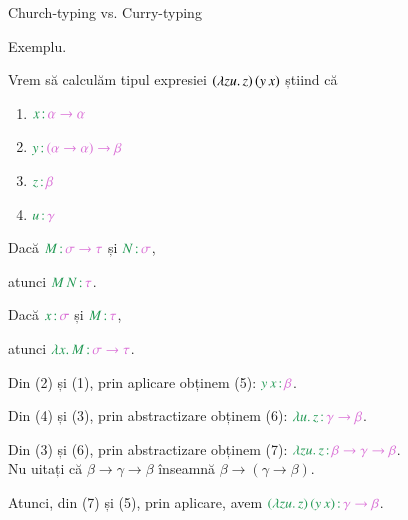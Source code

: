 \documentclass[xcolor=pdftex,romanian,colorlinks]{beamer}
\begin{document}
\begin{frame}{Church-typing vs. Curry-typing}

{\color{True} Exemplu.}

Vrem să calculăm tipul expresiei $(\lambda zu.\,z)\, (y\, x)$ știind că
\begin{minipage}{.45\columnwidth}
\begin{enumerate}
\item {\color{True}$\type{x}{\alpha \to \alpha}$}
\item {\color{True}$\type{y}{(\alpha \to \alpha) \to \beta}$}
\item ${\color{True}\type{z}{\beta}}$
\item ${\color{True}\type{u}{\gamma}}$
\end{enumerate}
\end{minipage} \hfill
\begin{minipage}{.54\columnwidth}
 \hfill Dacă $\type{M}{\sigma \to \tau}$ și $\type{N}{\sigma}$,

\hfill atunci $\type{\app{M}{N}}{\tau}$.

 \hfill Dacă $\type{x}{\sigma}$ și $\type{M}{\tau}$,

\hfill atunci $\type{\abs{x}{M}}{\sigma \to \tau}$.
\end{minipage}
\pause

Din (2) și (1), prin aplicare obținem (5): ${\color{True}\type{\app{y}{x}}{\beta}}$.

Din (4) și (3), prin abstractizare obținem (6): ${\color{True}\type{\abs{u}{z}}{\gamma \to \beta}}$.

Din (3) și (6), prin abstractizare obținem (7): ${\color{True}\type{\abs{zu}{z}}{\beta \to \gamma \to \beta}}$. \\
Nu uitați că $\beta \to \gamma \to \beta$ înseamnă $\beta \to (\gamma \to \beta)$.

Atunci, din (7) și (5), prin aplicare, avem {\color{True}$\type{\app{(\abs{zu}{z})}{(\app{y}{x})}}{\gamma \to \beta}$}.
\end{frame}
\end{document}
